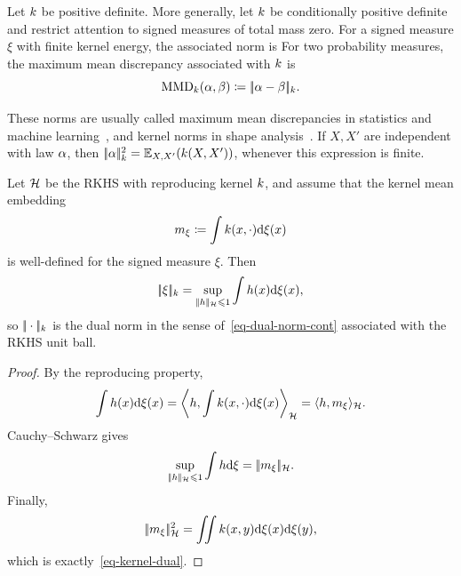 \begin{defn}\label{def-kernel-mmd-norm}
	Let $k$ be positive definite. More generally, let $k$ be conditionally positive definite and restrict attention to signed measures of total mass zero. For a signed measure $\xi$ with finite kernel energy, the associated norm is
	For two probability measures, the maximum mean discrepancy associated with $k$ is
	\[
		\operatorname{MMD}_{k}(\alpha,\beta)\coloneqq|\!| \alpha-\beta |\!|_{k}.
	\]
\end{defn}

These norms are usually called maximum mean discrepancies in statistics and machine learning~\cite{gretton2012kernel,muandet2017kernel}, and kernel norms in shape analysis~\cite{Hofmann2008}. If $X,X'$ are independent with law $\alpha$, then \(|\!| \alpha |\!|_{k}^2=\mathbb{E}_{X,X'}(k(X,X'))\), whenever this expression is finite.

\begin{prop}\label{prop-kernel-rkhs-dual}
	Let $\mathcal{H}$ be the RKHS with reproducing kernel $k$, and assume that the kernel mean embedding
	\[
		m_\xi \coloneqq \int k(x,\cdot)\mathrm{d}\xi(x)
	\]
	is well-defined for the signed measure $\xi$. Then
	\[
		|\!| \xi |\!|_{k}
		=
		\sup_{|\!| h |\!|_{\mathcal{H}}\leqslant1}
		\int h(x)\mathrm{d}\xi(x),
	\]
	so $|\!| \cdot |\!|_{k}$ is the dual norm in the sense of~\eqref{eq-dual-norm-cont} associated with the RKHS unit ball.
\end{prop}
\begin{proof}
	By the reproducing property,
	\[
		\int h(x)\mathrm{d}\xi(x)
		=
		\left\langle h,\int k(x,\cdot)\mathrm{d}\xi(x)\right\rangle_{\mathcal{H}}
		=
		\langle h,m_\xi\rangle_{\mathcal{H}}.
	\]
	Cauchy--Schwarz gives
	\[
		\sup_{|\!| h |\!|_{\mathcal{H}}\leqslant1}\int h\mathrm{d}\xi
		=
		|\!| m_\xi |\!|_{\mathcal{H}}.
	\]
	Finally,
	\[
		|\!| m_\xi |\!|_{\mathcal{H}}^2
		=
		\iint k(x,y)\mathrm{d}\xi(x)\mathrm{d}\xi(y),
	\]
	which is exactly~\eqref{eq-kernel-dual}.
\end{proof}

